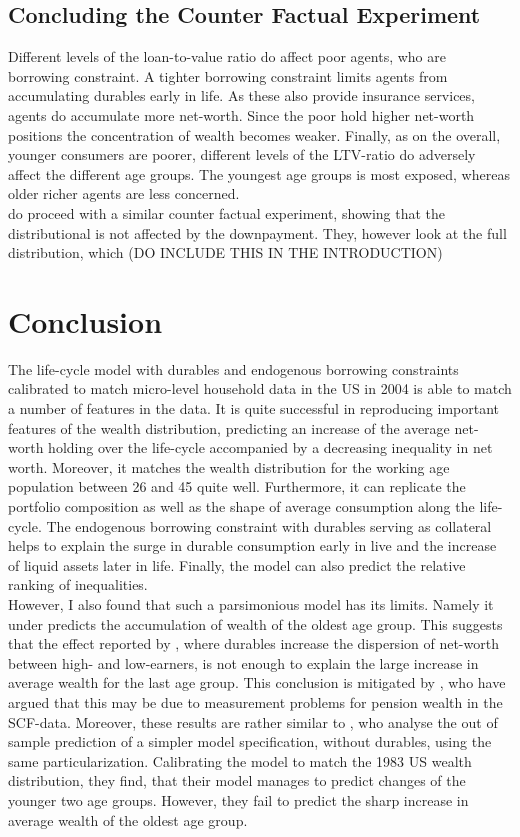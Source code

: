 \documentclass[a4paper,12pt,legno]{article}
\begin{document}
\subsection{Concluding the Counter Factual Experiment}
Different levels of the loan-to-value ratio do affect poor agents, who are borrowing constraint. A tighter borrowing constraint limits agents from accumulating durables early in life. As these also provide insurance services, agents do accumulate more net-worth. Since the poor hold higher net-worth positions the concentration of wealth becomes weaker. Finally, as on the overall, younger consumers are poorer, different levels of the LTV-ratio do adversely affect the different age groups. The youngest age groups is most exposed, whereas older richer agents are less concerned. \\
\cite{diaz2010} do proceed with a similar counter factual experiment, showing that the distributional is not affected by the downpayment. They, however look at the full distribution, which (DO INCLUDE THIS IN THE INTRODUCTION) 

\section{Conclusion}
The life-cycle model with durables and endogenous borrowing constraints calibrated to match micro-level household data in the US in 2004 is able to match a number of features in the data. It is quite successful in reproducing important features of the wealth distribution, predicting an increase of the average net-worth holding over the life-cycle accompanied by a decreasing inequality in net worth. Moreover, it matches the wealth distribution for the working age population between 26 and 45 quite well. Furthermore, it can replicate the portfolio composition as well as the shape of average consumption along the life-cycle. The endogenous borrowing constraint with durables serving as collateral helps to explain the surge in durable consumption early in live and the increase of liquid assets later in life. Finally, the model can also predict the relative ranking of inequalities. \\
However, I also found that such a parsimonious model has its limits. Namely it under predicts the accumulation of wealth of the oldest age group. This suggests that the effect reported by \citep{FV&K2011}, where durables increase the dispersion of net-worth between high- and low-earners, is not enough to explain the large increase in average wealth for the last age group. This conclusion is mitigated by \cite{hintermaier2011}, who have argued that this may be due to measurement problems for pension wealth in the SCF-data. Moreover, these results are rather similar to \cite{hintermaier2011}, who analyse the out of sample prediction of a simpler model specification, without durables, using the same particularization. Calibrating the model to match the 1983 US wealth distribution, they find, that their model manages to predict changes of the younger two age groups. However, they fail to predict the sharp increase in average wealth of the oldest age group. 
\end{document}
